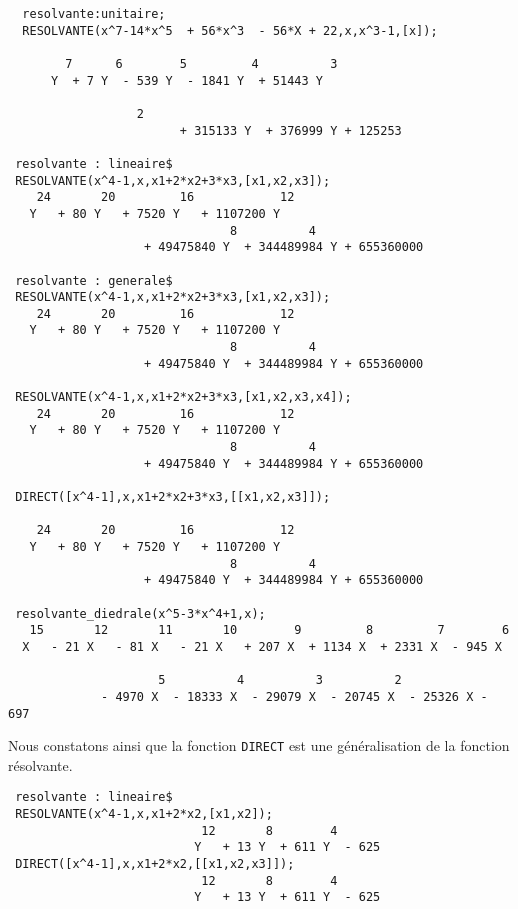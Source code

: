 \documentclass[11pt]{article}
\begin{document}
\begin{verbatim}
  resolvante:unitaire;
  RESOLVANTE(x^7-14*x^5  + 56*x^3  - 56*X + 22,x,x^3-1,[x]);

        7      6        5         4          3   
      Y  + 7 Y  - 539 Y  - 1841 Y  + 51443 Y  

				  2
                        + 315133 Y  + 376999 Y + 125253  

 resolvante : lineaire$
 RESOLVANTE(x^4-1,x,x1+2*x2+3*x3,[x1,x2,x3]);
    24       20         16            12       
   Y   + 80 Y   + 7520 Y   + 1107200 Y   
                               8	      4
                   + 49475840 Y  + 344489984 Y + 655360000
                                                      
 resolvante : generale$
 RESOLVANTE(x^4-1,x,x1+2*x2+3*x3,[x1,x2,x3]);
    24       20         16            12       
   Y   + 80 Y   + 7520 Y   + 1107200 Y   
                               8	      4
                   + 49475840 Y  + 344489984 Y + 655360000

 RESOLVANTE(x^4-1,x,x1+2*x2+3*x3,[x1,x2,x3,x4]);
    24       20         16            12       
   Y   + 80 Y   + 7520 Y   + 1107200 Y   
                               8	      4
                   + 49475840 Y  + 344489984 Y + 655360000

 DIRECT([x^4-1],x,x1+2*x2+3*x3,[[x1,x2,x3]]);

    24       20         16            12       
   Y   + 80 Y   + 7520 Y   + 1107200 Y   
                               8	      4
                   + 49475840 Y  + 344489984 Y + 655360000

 resolvante_diedrale(x^5-3*x^4+1,x);
   15       12       11       10        9         8         7        6
  X   - 21 X   - 81 X   - 21 X   + 207 X  + 1134 X  + 2331 X  - 945 X

                     5          4          3          2
             - 4970 X  - 18333 X  - 29079 X  - 20745 X  - 25326 X - 697
\end{verbatim}
\normalsize
Nous constatons ainsi que la fonction {\tt DIRECT} est une g\'en\'eralisation
de la fonction r\'esolvante.
\small
\begin{verbatim} 
 resolvante : lineaire$
 RESOLVANTE(x^4-1,x,x1+2*x2,[x1,x2]);
                           12       8        4
                          Y   + 13 Y  + 611 Y  - 625
 DIRECT([x^4-1],x,x1+2*x2,[[x1,x2,x3]]);
                           12       8        4
                          Y   + 13 Y  + 611 Y  - 625
\end{verbatim}
\end{document}
